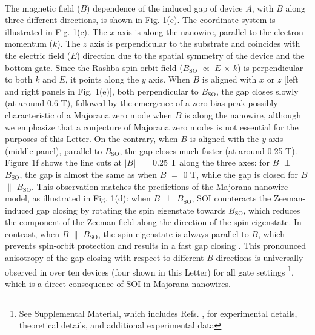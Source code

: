 \\ \indent
The magnetic field ($B$) dependence of the induced gap of device $A$, with $B$ along three different directions, is shown in Fig. 1(e). The coordinate system is illustrated in Fig. 1(c). The $x$ axis is along the nanowire, parallel to the electron momentum ($k$). The $z$ axis is perpendicular to the substrate and coincides with the electric field ($E$) direction due to the spatial symmetry of the device and the bottom gate. Since the Rashba spin-orbit field ($B_{\mathrm{SO}}$ $\propto$ $E$ $\times$ $k$) is perpendicular to both $k$ and $E$, it points along the $y$ axis. When $B$ is aligned with $x$ or $z$ [left and right panels in Fig. 1(e)], both perpendicular to $B_{\mathrm{SO}}$, the gap closes \mbox{slowly} (at around 0.6 T), followed by the emergence of a zero-bias peak possibly characteristic of a Majorana zero mode when $B$ is along the nanowire, although we emphasize that a conjecture of Majorana zero modes is not essential for the purposes of this Letter. On the contrary, when $B$ is aligned with the $y$ axis (middle panel), parallel to $B_{\mathrm{SO}}$, the gap closes much faster (at around 0.25 T). Figure 1f shows the line cuts at $|B|$ $=$ 0.25 T along the three axes: for $B$ $\perp$ $B_{\mathrm{SO}}$, the gap is almost the same as when $B$ $=$ 0 T, while the gap is closed for $B$ $\parallel$ $B_{\mathrm{SO}}$. This observation matches the predictions of the Majorana nanowire model, as illustrated in Fig. 1(d): when $B$ $\perp$ $B_{\mathrm{SO}}$, SOI counteracts the Zeeman-induced gap closing by rotating the spin eigenstate towards $B_{\mathrm{SO}}$, which reduces the component of the Zeeman field along the direction of the spin eigenstate. In contrast, when $B$ $\parallel$ $B_{\mathrm{SO}}$, the spin eigenstate is always parallel to $B$, which prevents spin-orbit protection and results in a fast gap closing \cite{Osca2014,Rex2014}. This pronounced anisotropy of the gap closing with respect to different $B$ directions is universally observed in over ten devices (four shown in this Letter) for all gate settings 
\footnote{See Supplemental Material, which includes Refs. 
 \cite{Car2014,Flohr2011,Suyatin2007,HardGap,Liu2017,Danon2017,Hofstader1976,Gropp1996,Du1999,Prada2012,Pientka2012,Stanescu2012}, for experimental details, theoretical details, and additional experimental data}, which is a direct consequence of SOI in Majorana nanowires.
\nocite{Car2014,Flohr2011,Suyatin2007,HardGap,Liu2017,Danon2017,Hofstader1976,Gropp1996,Du1999,Prada2012,Pientka2012,Stanescu2012}
\\ \indent
